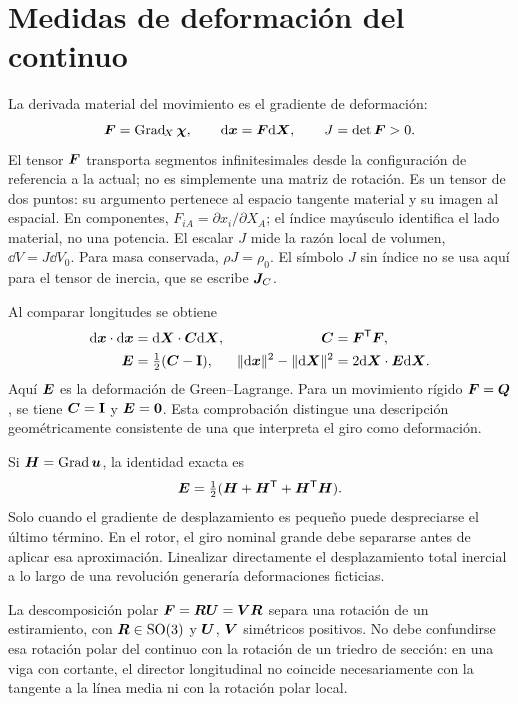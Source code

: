 \section{Medidas de deformación del continuo}
La derivada material del movimiento es el gradiente de deformación:
\begin{equation}
 \boldsymbol{F}=\operatorname{Grad}_{\!X}\bm{\chi},
 \qquad \mathrm d\bm{x}=\boldsymbol{F}\mathrm d\bm{X},
 \qquad J=\det\boldsymbol{F}>0.
\end{equation}
El tensor $\boldsymbol{F}$ transporta segmentos infinitesimales desde la configuración de referencia a la actual; no es simplemente una matriz de rotación. Es un tensor de dos puntos: su argumento pertenece al espacio tangente material y su imagen al espacial. En componentes, $F_{iA}=\partial x_i/\partial X_A$; el índice mayúsculo identifica el lado material, no una potencia. El escalar $J$ mide la razón local de volumen, $\dd V=J\dd V_0$. Para masa conservada, $\rho J=\rho_0$. El símbolo $J$ sin índice no se usa aquí para el tensor de inercia, que se escribe $\boldsymbol{J}_C$.

Al comparar longitudes se obtiene
\begin{align}
 \mathrm d\bm{x}\cdot\mathrm d\bm{x}&=\mathrm d\bm{X}\cdot\boldsymbol{C}\mathrm d\bm{X},
 &\boldsymbol{C}&=\boldsymbol{F}^\mathsf T\boldsymbol{F},\\
 \boldsymbol{E}&=\tfrac12(\boldsymbol{C}-\mathbf I),
 &\|\mathrm d\bm{x}\|^2-\|\mathrm d\bm{X}\|^2&=2\mathrm d\bm{X}\cdot\boldsymbol{E}\mathrm d\bm{X}.
\end{align}
Aquí $\boldsymbol{E}$ es la deformación de Green--Lagrange. Para un movimiento rígido $\boldsymbol{F}=\boldsymbol{Q}$, se tiene $\boldsymbol{C}=\mathbf I$ y $\boldsymbol{E}=\boldsymbol{0}$. Esta comprobación distingue una descripción geométricamente consistente de una que interpreta el giro como deformación.

Si $\boldsymbol{H}=\operatorname{Grad}\bm{u}$, la identidad exacta es
\begin{equation}
 \boldsymbol{E}=\tfrac12(\boldsymbol{H}+\boldsymbol{H}^\mathsf T+\boldsymbol{H}^\mathsf T\boldsymbol{H}).
\end{equation}
Solo cuando el gradiente de desplazamiento es pequeño puede despreciarse el último término. En el rotor, el giro nominal grande debe separarse antes de aplicar esa aproximación. Linealizar directamente el desplazamiento total inercial a lo largo de una revolución generaría deformaciones ficticias.

La descomposición polar $\boldsymbol{F}=\boldsymbol{R}\boldsymbol{U}=\boldsymbol{V}\boldsymbol{R}$ separa una rotación de un estiramiento, con $\boldsymbol{R}\in\operatorname{SO}(3)$ y $\boldsymbol{U}$, $\boldsymbol{V}$ simétricos positivos. No debe confundirse esa rotación polar del continuo con la rotación de un triedro de sección: en una viga con cortante, el director longitudinal no coincide necesariamente con la tangente a la línea media ni con la rotación polar local.

